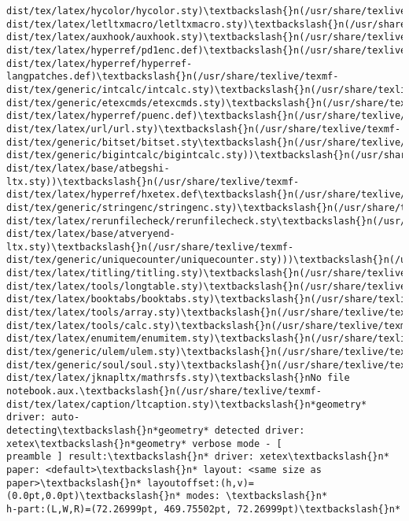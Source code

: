 \documentclass[11pt]{article}
\begin{document}
\begin{Verbatim}[commandchars=\\\{\}]
dist/tex/latex/hycolor/hycolor.sty)\textbackslash{}n(/usr/share/texlive/texmf-
dist/tex/latex/letltxmacro/letltxmacro.sty)\textbackslash{}n(/usr/share/texlive/texmf-
dist/tex/latex/auxhook/auxhook.sty)\textbackslash{}n(/usr/share/texlive/texmf-
dist/tex/latex/hyperref/pd1enc.def)\textbackslash{}n(/usr/share/texlive/texmf-
dist/tex/latex/hyperref/hyperref-langpatches.def)\textbackslash{}n(/usr/share/texlive/texmf-
dist/tex/generic/intcalc/intcalc.sty)\textbackslash{}n(/usr/share/texlive/texmf-
dist/tex/generic/etexcmds/etexcmds.sty)\textbackslash{}n(/usr/share/texlive/texmf-
dist/tex/latex/hyperref/puenc.def)\textbackslash{}n(/usr/share/texlive/texmf-
dist/tex/latex/url/url.sty)\textbackslash{}n(/usr/share/texlive/texmf-
dist/tex/generic/bitset/bitset.sty\textbackslash{}n(/usr/share/texlive/texmf-
dist/tex/generic/bigintcalc/bigintcalc.sty))\textbackslash{}n(/usr/share/texlive/texmf-
dist/tex/latex/base/atbegshi-ltx.sty))\textbackslash{}n(/usr/share/texlive/texmf-
dist/tex/latex/hyperref/hxetex.def\textbackslash{}n(/usr/share/texlive/texmf-
dist/tex/generic/stringenc/stringenc.sty)\textbackslash{}n(/usr/share/texlive/texmf-
dist/tex/latex/rerunfilecheck/rerunfilecheck.sty\textbackslash{}n(/usr/share/texlive/texmf-
dist/tex/latex/base/atveryend-ltx.sty)\textbackslash{}n(/usr/share/texlive/texmf-
dist/tex/generic/uniquecounter/uniquecounter.sty)))\textbackslash{}n(/usr/share/texlive/texmf-
dist/tex/latex/titling/titling.sty)\textbackslash{}n(/usr/share/texlive/texmf-
dist/tex/latex/tools/longtable.sty)\textbackslash{}n(/usr/share/texlive/texmf-
dist/tex/latex/booktabs/booktabs.sty)\textbackslash{}n(/usr/share/texlive/texmf-
dist/tex/latex/tools/array.sty)\textbackslash{}n(/usr/share/texlive/texmf-
dist/tex/latex/tools/calc.sty)\textbackslash{}n(/usr/share/texlive/texmf-
dist/tex/latex/enumitem/enumitem.sty)\textbackslash{}n(/usr/share/texlive/texmf-
dist/tex/generic/ulem/ulem.sty)\textbackslash{}n(/usr/share/texlive/texmf-
dist/tex/generic/soul/soul.sty)\textbackslash{}n(/usr/share/texlive/texmf-
dist/tex/latex/jknapltx/mathrsfs.sty)\textbackslash{}nNo file
notebook.aux.\textbackslash{}n(/usr/share/texlive/texmf-
dist/tex/latex/caption/ltcaption.sty)\textbackslash{}n*geometry* driver: auto-
detecting\textbackslash{}n*geometry* detected driver: xetex\textbackslash{}n*geometry* verbose mode - [
preamble ] result:\textbackslash{}n* driver: xetex\textbackslash{}n* paper: <default>\textbackslash{}n* layout: <same size as
paper>\textbackslash{}n* layoutoffset:(h,v)=(0.0pt,0.0pt)\textbackslash{}n* modes: \textbackslash{}n*
h-part:(L,W,R)=(72.26999pt, 469.75502pt, 72.26999pt)\textbackslash{}n*

\end{Verbatim}
\end{document}
